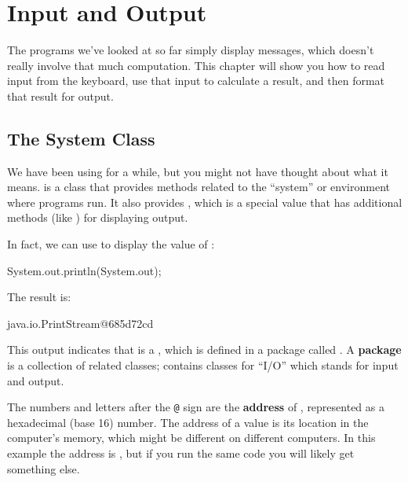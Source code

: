 \chapter{Input and Output}

The programs we've looked at so far simply display messages, which doesn't really involve that much computation.
This chapter will show you how to read input from the keyboard, use that input to calculate a result, and then format that result for output.


\section{The System Class}


We have been using  for a while, but you might not have thought about what it means.
 is a class that provides methods related to the ``system'' or environment where programs run.
It also provides , which is a special value that has additional methods (like ) for displaying output.


In fact, we can use  to display the value of :

\begin{code}
System.out.println(System.out);
\end{code}

The result is:

\begin{stdout}
java.io.PrintStream@685d72cd
\end{stdout}


This output indicates that  is a , which is defined in a package called .
A {\bf package} is a collection of related classes;  contains classes for ``I/O'' which stands for input and output.


The numbers and letters after the {\tt @} sign are the {\bf address} of , represented as a hexadecimal (base 16) number.
The address of a value is its location in the computer's memory, which might be different on different computers.
In this example the address is , but if you run the same code you will likely get something else.

